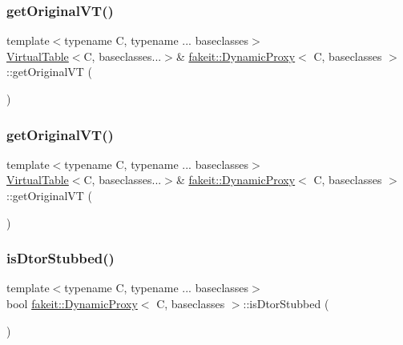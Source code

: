 \subsubsection{\texorpdfstring{getOriginalVT()}{getOriginalVT()}\hspace{0.1cm}{\footnotesize\ttfamily [8/9]}}
{\footnotesize\ttfamily template$<$typename C, typename ... baseclasses$>$ \\
\mbox{\hyperlink{structfakeit_1_1VirtualTable}{Virtual\+Table}}$<$C, baseclasses...$>$\& \mbox{\hyperlink{structfakeit_1_1DynamicProxy}{fakeit\+::\+Dynamic\+Proxy}}$<$ C, baseclasses $>$\+::get\+Original\+VT (\begin{DoxyParamCaption}{ }\end{DoxyParamCaption})\hspace{0.3cm}{\ttfamily [inline]}}

\mbox{\label{structfakeit_1_1DynamicProxy_aa34a496518156007196fd405dbf2e058}} 
\subsubsection{\texorpdfstring{getOriginalVT()}{getOriginalVT()}\hspace{0.1cm}{\footnotesize\ttfamily [9/9]}}
{\footnotesize\ttfamily template$<$typename C, typename ... baseclasses$>$ \\
\mbox{\hyperlink{structfakeit_1_1VirtualTable}{Virtual\+Table}}$<$C, baseclasses...$>$\& \mbox{\hyperlink{structfakeit_1_1DynamicProxy}{fakeit\+::\+Dynamic\+Proxy}}$<$ C, baseclasses $>$\+::get\+Original\+VT (\begin{DoxyParamCaption}{ }\end{DoxyParamCaption})\hspace{0.3cm}{\ttfamily [inline]}}

\mbox{\label{structfakeit_1_1DynamicProxy_a6d3f0dfa93dc98b37fb50002bc4ea2bc}} 
\subsubsection{\texorpdfstring{isDtorStubbed()}{isDtorStubbed()}\hspace{0.1cm}{\footnotesize\ttfamily [1/9]}}
{\footnotesize\ttfamily template$<$typename C, typename ... baseclasses$>$ \\
bool \mbox{\hyperlink{structfakeit_1_1DynamicProxy}{fakeit\+::\+Dynamic\+Proxy}}$<$ C, baseclasses $>$\+::is\+Dtor\+Stubbed (\begin{DoxyParamCaption}{ }\end{DoxyParamCaption})\hspace{0.3cm}{\ttfamily [inline]}}

